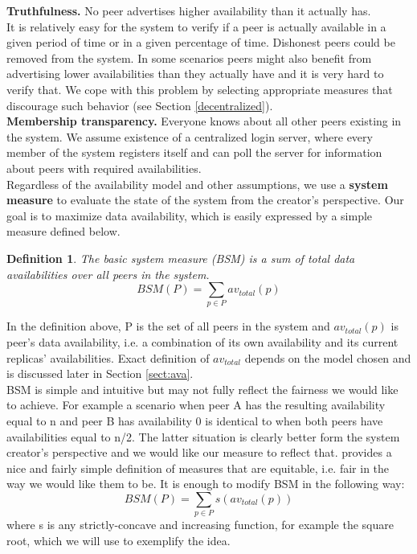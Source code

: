 \documentclass{pracamgren}
\newcounter{collective_ctr} \numberwithin{collective_ctr}{chapter}
\newtheorem{definition}[collective_ctr]{Definition}
\begin{document}
{\bf Truthfulness.} No peer advertises higher availability than it actually has.\\
It is relatively easy for the system to verify if a peer is actually available in a given period of time or in a given percentage of time. Dishonest peers could be removed from the system. In some scenarios peers might also benefit from advertising lower availabilities than they actually have and it is very hard to verify that. We cope with this problem by selecting appropriate measures that discourage such behavior (see Section \ref{decentralized}).\\

{\bf Membership transparency.} Everyone knows about all other peers existing in the system. We assume existence of a centralized login server, where every member of the system registers itself and can poll the server for information about peers with required availabilities.\\

Regardless of the availability model and other assumptions, we use a {\bf system measure} to evaluate the state of the system from the creator's perspective. Our goal is to maximize data availability, which is easily expressed by a simple measure defined below.

\begin{definition}
The {\it basic system measure (BSM)} is a sum of total data availabilities over all peers in the system.
$$BSM(P) = \sum_{p\in P} av_{total}(p)$$
\end{definition}


In the definition above, P is the set of all peers in the system and $av_{total}(p)$ is peer's data availability, i.e. a combination of its own availability and its current replicas' availabilities. Exact definition of $av_{total}$ depends on the model chosen and is discussed later in Section \ref{sect:ava}.\\

BSM is simple and intuitive but may not fully reflect the fairness we would like to achieve. For example a scenario when peer A has the resulting availability equal to n and peer B has availability 0 is identical to when both peers have availabilities equal to n/2. The latter situation is clearly better form the system creator's perspective and we would like our measure to reflect that. \cite{equitable} provides a nice and fairly simple definition of measures that are equitable, i.e. fair in the way we would like them to be. It is enough to modify BSM in the following way:\\
$$BSM(P) = \sum_{p\in P} s(av_{total}(p))$$
where s is any strictly-concave and increasing function, for example the square root, which we will use to exemplify the idea.\\
\end{document}
